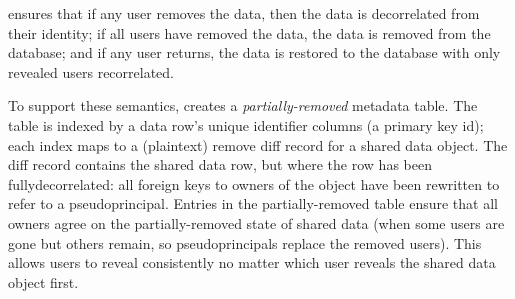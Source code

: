 %
\sys ensures that \one{} if any user removes the data, then the data is
decorrelated from their identity; \two{} if all users have removed the data, the
data is removed from the database; and \three{} if any user returns, the data is
restored to the database with only revealed users recorrelated.  
%

%
To support these semantics, \sys creates a \emph{partially-removed} metadata
table. The table is indexed by a data row's unique identifier columns (\eg a
primary key id); each index maps to a (plaintext) remove diff record for a
shared data object. The diff record contains the shared data row, but where the
row has been fully\-decorrelated: all foreign keys to owners of the object have
been rewritten to refer to a pseudoprincipal.
%
Entries in the partially-removed table ensure that all owners agree on the
partially-removed state of shared data (\eg when some users are gone but others
remain, so pseudoprincipals replace the removed users). This allows users to
reveal consistently no matter which user reveals the shared data object first. 
%


